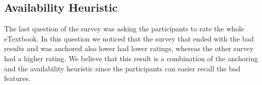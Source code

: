 \documentclass[Main.tex]{subfiles}
\begin{document}
\subsection{Availability Heuristic}
The last question of the survey was asking the participants to rate the whole eTextbook. In this question we noticed that the survey that ended with the bad results and was anchored also lower had lower ratings, whereas the other survey had a higher rating. We believe that this result is a combination of the anchoring and the availability heuristic since the participants can easier recall the bad features. 

\end{document}
